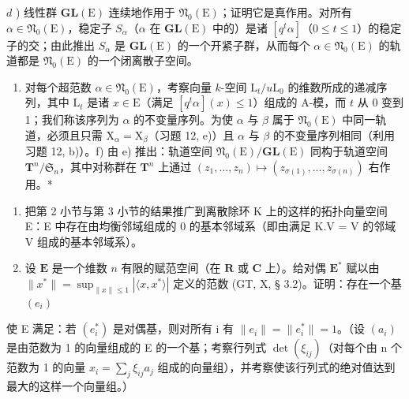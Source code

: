 \(d\) ) 线性群 \(\mathbf{GL}(\mathrm{E})\) 连续地作用于 \(\mathfrak{N}_0(\mathrm{E})\)；证明它是真作用。对所有 \(\alpha \in \mathfrak{N}_0(\mathrm{E})\)，稳定子 \(S_{\alpha}\)（\(\alpha\) 在 \(\mathbf{GL}(\mathrm{E})\) 中的）是诸 \([q^t\alpha]\)（\(0\leqslant t\leqslant 1\)）的稳定子的交；由此推出 \(S_{\alpha}\) 是 \(\mathbf{GL}(\mathrm{E})\) 的一个开紧子群，从而每个 \(\alpha \in \mathfrak{N}_0(\mathrm{E})\) 的轨道都是 \(\mathfrak{N}_0(\mathrm{E})\) 的一个闭离散子空间。

\begin{enumerate}
\def\labelenumi{\alph{enumi})}
\setcounter{enumi}{4}
\tightlist
\item
  对每个超范数 \(\alpha \in \mathfrak{N}_0(\mathrm{E})\)，考察向量 \(k\)-空间 \(\mathrm{L}_t / u\mathrm{L}_0\) 的维数所成的递减序列，其中 \(\mathrm{L}_t\) 是诸 \(x \in \mathrm{E}\)（满足 \([q^t\alpha](x) \leqslant 1\)）组成的 A-模，而 \(t\) 从 0 变到 1；我们称该序列为 \(\alpha\) 的不变量序列。为使 \(\alpha\) 与 \(\beta\) 属于 \(\mathfrak{N}_0(\mathrm{E})\) 中同一轨道，必须且只需 \(\mathrm{X}_{\alpha} = \mathrm{X}_{\beta}\)（习题 12, e)）且 \(\alpha\) 与 \(\beta\) 的不变量序列相同（利用习题 12, b)）。f) 由 e) 推出：轨道空间 \(\mathfrak{N}_0(\mathrm{E}) / \mathbf{GL}(\mathrm{E})\) 同构于轨道空间 \(\mathbf{T}^n / \mathfrak{S}_n\)，其中对称群在 \(\mathbf{T}^n\) 上通过 \((z_1, ..., z_n) \mapsto (z_{\sigma(1)}, ..., z_{\sigma(n)})\) 右作用。*
\end{enumerate}

\begin{enumerate}
\def\labelenumi{\arabic{enumi})}
\setcounter{enumi}{13}
\item
  把第 2 小节与第 3 小节的结果推广到离散除环 K 上的这样的拓扑向量空间 E：E 中存在由均衡邻域组成的 0 的基本邻域系（即由满足 K.V = V 的邻域 V 组成的基本邻域系）。
\item
  设 \(\mathbf{E}\) 是一个维数 \(n\) 有限的赋范空间（在 \(\mathbf{R}\) 或 \(\mathbf{C}\) 上）。给对偶 \(\mathbf{E}^*\) 赋以由 \(\| x^* \| = \sup_{\| x \| \leqslant 1} |\langle x, x^* \rangle|\) 定义的范数 (GT, X, § 3.2)。证明：存在一个基 \((e_i)\)
\end{enumerate}

使 E 满足：若 \((e_{i}^{*})\) 是对偶基，则对所有 i 有 \(\|e_{i}\| = \|e_{i}^{*}\| = 1\)。（设 \((a_{i})\) 是由范数为 1 的向量组成的 E 的一个基；考察行列式 \(\det(\xi_{ij})\)（对每个由 n 个范数为 1 的向量 \(x_{i} = \sum_{j} \xi_{ij} a_{j}\) 组成的向量组），并考察使该行列式的绝对值达到最大的这样一个向量组。）


